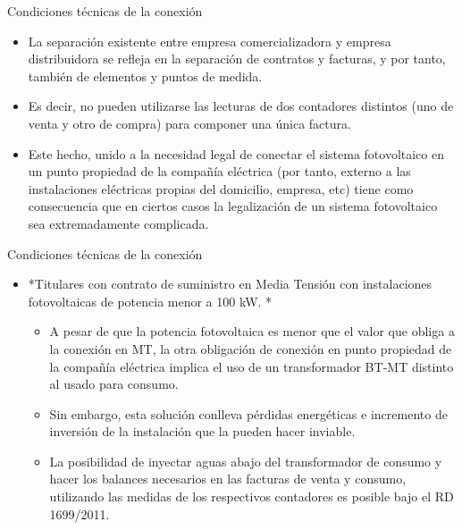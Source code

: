 \documentclass[xcolor={usenames,svgnames,dvipsnames}]{beamer}
\begin{document}
\begin{frame}[label=sec-1-0-21]{Condiciones técnicas de la conexión}
\begin{itemize}
\item La separación existente entre empresa comercializadora y empresa
distribuidora se refleja en la separación de contratos y facturas, y
por tanto, también de elementos y puntos de medida.

\item Es decir, no pueden utilizarse las lecturas de dos contadores
distintos (uno de venta y otro de compra) para componer una única
factura.

\item Este hecho, unido a la necesidad legal de conectar el sistema
fotovoltaico en un punto propiedad de la compañía eléctrica (por
tanto, externo a las instalaciones eléctricas propias del domicilio,
empresa, etc) tiene como consecuencia que en ciertos casos la
legalización de un sistema fotovoltaico sea extremadamente
complicada.
\end{itemize}
\end{frame}

\begin{frame}[label=sec-1-0-22]{Condiciones técnicas de la conexión}
\begin{itemize}
\item *Titulares con contrato de suministro en Media Tensión con
instalaciones fotovoltaicas de potencia menor a 100 kW. *

\begin{itemize}
\item A pesar de que la potencia fotovoltaica es menor que el valor que
obliga a la conexión en MT, la otra obligación de conexión en
punto propiedad de la compañía eléctrica implica el uso de un
transformador BT-MT distinto al usado para consumo.

\item Sin embargo, esta solución conlleva pérdidas energéticas e
incremento de inversión de la instalación que la pueden hacer
inviable.

\item La posibilidad de inyectar aguas abajo del transformador de
consumo y hacer los balances necesarios en las facturas de venta y
consumo, utilizando las medidas de los respectivos contadores es
posible bajo el RD 1699/2011.
\end{itemize}
\end{itemize}
\end{frame}
\end{document}
